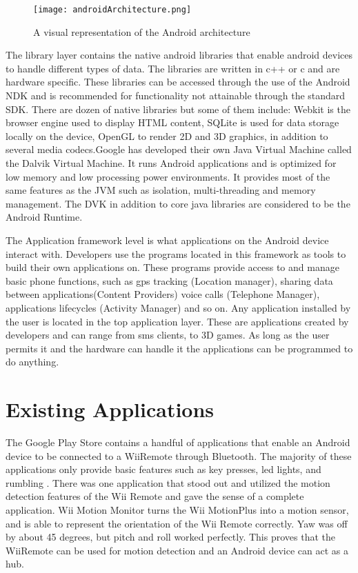 \begin{figure}[!h]
  \centering
    \texttt{[image: androidArchitecture.png]}
    \caption{\footnotesize A visual representation of the Android architecture}
\end{figure}

The library layer contains the native android libraries that enable android devices to handle different types of data. The libraries are written in c++ or c and are hardware specific. These libraries can be accessed through the use of the Android NDK and is recommended for functionality not attainable through the standard SDK. There are dozen of native libraries but some of them include: Webkit is the browser engine used to display HTML content, SQLite is used for data storage locally on the device, OpenGL to render 2D and 3D graphics, in addition to several media codecs.Google has developed their own Java Virtual Machine called the Dalvik Virtual Machine. It runs Android applications and is optimized for low memory and low processing power environments. It provides most of the same features as the JVM such as isolation, multi-threading and memory management. The DVK in addition to core java libraries are considered to be the Android Runtime.

The Application framework level is what applications on the Android device interact with. Developers use the programs located in this framework as tools to build their own applications on. These programs provide access to and manage basic phone functions, such as gps tracking (Location manager), sharing data between applications(Content Providers) voice calls (Telephone Manager), applications lifecycles (Activity Manager) and so on. Any application installed by the user is located in the top application layer. These are applications created by developers and can range from sms clients, to 3D games. As long as the user permits it and the hardware can handle it the applications can be programmed to do anything.


\section{Existing Applications}
The Google Play Store contains a handful of applications that enable an Android device to be connected to a WiiRemote through Bluetooth. The majority of these applications only provide basic features such as key presses, led lights, and rumbling \cite{wiimoteController, simpleWiiController}. There was one application that stood out and utilized the motion detection features of the Wii Remote and gave the sense of a complete application. Wii Motion Monitor \cite{wiiMotionMonitor} turns the Wii MotionPlus into a motion sensor, and is able to represent the orientation of the Wii Remote correctly. Yaw was off by about 45 degrees, but pitch and roll worked perfectly. This proves that the WiiRemote can be used for motion detection and an Android device can act as a hub.

